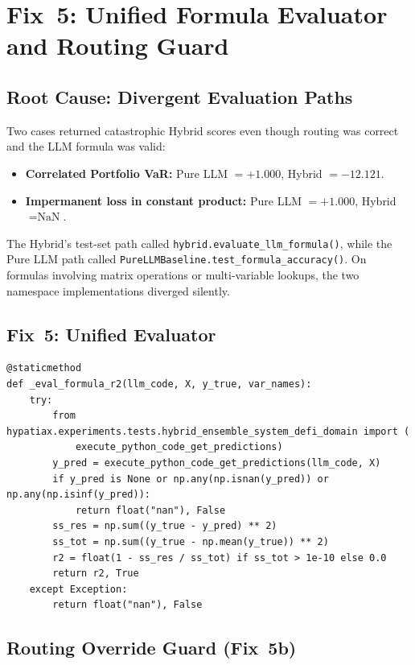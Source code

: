 \documentclass[twoside,11pt]{article}
\begin{document}
\section{Fix~5: Unified Formula Evaluator and Routing Guard}
\label{sec:fix5}

\subsection{Root Cause: Divergent Evaluation Paths}

Two cases returned catastrophic Hybrid scores even though routing was correct
and the LLM formula was valid:

\begin{itemize}[leftmargin=*]
  \item \textbf{Correlated Portfolio VaR:} Pure LLM $= +1.000$,
    Hybrid $= -12.121$.
  \item \textbf{Impermanent loss in constant product:} Pure LLM $= +1.000$,
    Hybrid $= \text{NaN}$.
\end{itemize}

The Hybrid's test-set path called \texttt{hybrid.evaluate\_llm\_formula()},
while the Pure LLM path called
\texttt{PureLLMBaseline.test\_formula\_accuracy()}.  On formulas involving
matrix operations or multi-variable lookups, the two namespace implementations
diverged silently.

\subsection{Fix~5: Unified Evaluator}

\begin{lstlisting}[caption={Unified formula evaluator (Fix~5).}]
@staticmethod
def _eval_formula_r2(llm_code, X, y_true, var_names):
    try:
        from hypatiax.experiments.tests.hybrid_ensemble_system_defi_domain import (
            execute_python_code_get_predictions)
        y_pred = execute_python_code_get_predictions(llm_code, X)
        if y_pred is None or np.any(np.isnan(y_pred)) or np.any(np.isinf(y_pred)):
            return float("nan"), False
        ss_res = np.sum((y_true - y_pred) ** 2)
        ss_tot = np.sum((y_true - np.mean(y_true)) ** 2)
        r2 = float(1 - ss_res / ss_tot) if ss_tot > 1e-10 else 0.0
        return r2, True
    except Exception:
        return float("nan"), False
\end{lstlisting}

\subsection{Routing Override Guard (Fix~5b)}
\end{document}
